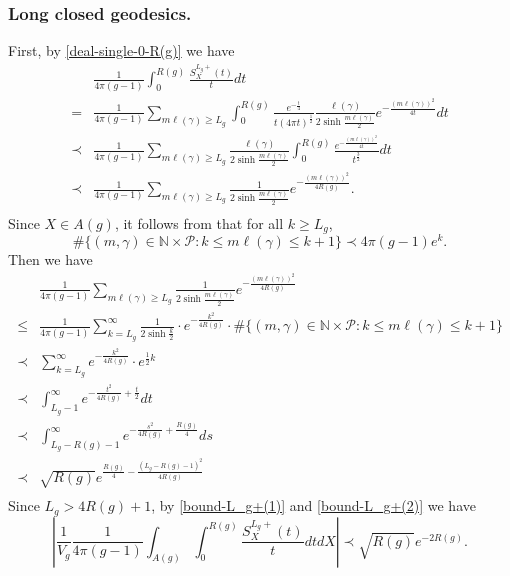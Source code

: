 \documentclass[11pt]{amsart}
\theoremstyle{plain}
\theoremstyle{definition}
\theoremstyle{remark}
\begin{document}
\subsubsection{Long closed geodesics.}
First, by \eqref{deal-single-0-R(g)} we have 
\begin{equation}\label{bound-L_g+(1)}
 \begin{aligned}
     &\frac{1}{4\pi(g-1)}\int_0^{R(g)}\frac{S_X^{L_g+}(t)}{t}dt\\
     = &\frac{1}{4\pi(g-1)}\sum_{m\ell(\gamma)\geq L_g}\int_0^{R(g)}\frac{e^{-\frac{t}{4}}}{t(4\pi t)^{\frac{1}{2}}}\frac{\ell(\gamma)}{2\sinh\frac{m\ell(\gamma)}{2}}e^{-\frac{(m\ell(\gamma))^2}{4t}}dt\\
     \prec&    \frac{1}{4\pi(g-1)}\sum_{m\ell(\gamma)\geq L_g} \frac{\ell(\gamma)}{2\sinh\frac{m\ell(\gamma)}{2}}\int_0^{R(g)}\frac{e^{-\frac{(m\ell(\gamma))^2}{4t}}}{t^{\frac{3}{2}}}dt
     \\
     \prec&\frac{1}{4\pi(g-1)}\sum_{m\ell(\gamma)\geq L_g}\frac{1}{2\sinh \frac{m\ell(\gamma)}{2}}e^{-\frac{(m\ell(\gamma))^2}{4R(g)}}.\\
\end{aligned}\end{equation}
Since $X\in A(g)$, 
 it follows from \cite[Lemma 3.2]{naud2023determinants} that for all $k\geq L_g$,
 $$\#\{(m,\gamma)\in \mathbb{N}\times\mathcal{P}:k\leq m\ell(\gamma)\leq k+1\}\prec 4\pi(g-1)e^k.$$ Then we have \begin{equation}\label{bound-L_g+(2)}
     \begin{aligned}
         &\frac{1}{4\pi(g-1)}\sum_{m\ell(\gamma)\geq L_g}\frac{1}{2\sinh \frac{m\ell(\gamma)}{2}}e^{-\frac{(m\ell(\gamma))^2}{4R(g)}}\\
         \leq &
         \frac{1}{4\pi(g-1)}\sum_{k=L_g}^\infty
          \frac{1}{2\sinh \frac{k}{2}}\cdot e^{-\frac{k^2}{4R(g)}}\cdot \#\{(m,\gamma)\in \mathbb{N}\times\mathcal{P}:k\leq m\ell(\gamma)\leq k+1\}\\
          \prec &
         \sum_{k=L_g}^\infty
          e^{-\frac{k^2}{4R(g)}}\cdot e^{\frac{1}{2}k}\\
          \prec&\int_{L_g-1}^\infty e^{-\frac{t^2}{4R(g)}+\frac{t}{2}}dt \\
\prec & \int_{L_g-R(g)-1}^\infty e^{-\frac{s^2}{4R(g)}+\frac{R(g)}{4}} ds\\
          \prec& \sqrt{R(g)} e^{\frac{R(g)}{4}-\frac{(L_g-R(g)-1)^2}{4R(g)}}\\
     \end{aligned}
 \end{equation} 
 Since $L_g>4R(g)+1$,
by \eqref{bound-L_g+(1)} and \eqref{bound-L_g+(2)} we have \begin{equation}\label{bound-L_g+}
    \left| \frac{1}{V_g}\frac{1}{4\pi(g-1)}\int_{A(g)}\int_0^{R(g)} \frac{S_X^{L_g+}(t)}{t}dtdX  \right|\prec \sqrt{R(g)} e^{-2R(g)}.
\end{equation}
\end{document}
